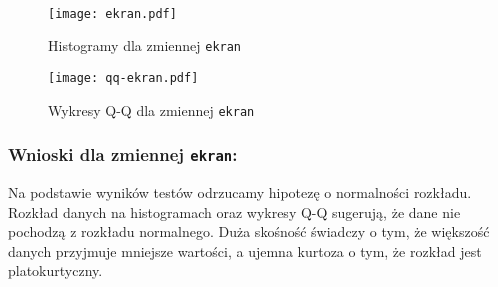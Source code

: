 \documentclass[12pt,a4paper]{article}
\begin{document}
\\
\begin{figure}[H]
    \centering
    \texttt{[image: ekran.pdf]}
    \caption{Histogramy dla zmiennej \texttt{ekran}}
\end{figure}
\begin{figure}[H]
    \centering
    \texttt{[image: qq-ekran.pdf]}
    \caption{Wykresy Q-Q dla zmiennej \texttt{ekran}}
\end{figure}

\subsubsection*{Wnioski dla zmiennej \texttt{ekran}:}
Na podstawie wyników testów odrzucamy hipotezę o normalności rozkładu. Rozkład danych na histogramach oraz wykresy Q-Q sugerują, że dane nie pochodzą z rozkładu normalnego. Duża skośność świadczy o tym, że większość danych przyjmuje mniejsze wartości, a ujemna kurtoza o tym, że rozkład jest platokurtyczny.
\end{document}
